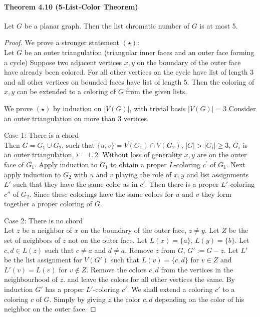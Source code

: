 \paragraph{Theorem 4.10 (5-List-Color Theorem)} Let $ G $ be a planar graph.
Then the list chromatic number of $ G $ is at most 5.
\begin{proof}
    We prove a stronger statement $(\star)$: \\
    Let $G$ be an outer triangulation (triangular inner faces and an 
    outer face forming a cycle) Suppose two adjacent vertices $x,y$
    on the boundary of the outer face have already been colored. 
    For all other vertices on the cycle have list of length 3 and 
    all other vertices on bounded faces have list of length 5. Then 
    the coloring of $x,y$ can be extended to a coloring of $G$ from 
    the given lists.

    \bigskip \noindent
    We prove $(\star)$ by induction on $|V(G)|$, with trivial basis $|V(G)| =3$
    Consider an outer triangulation on more than 3 vertices.

    \smallskip \noindent
    Case 1: There is a chord \\
    Then $G = G_1 \cup G_2$, such that $\{u,v\} = V(G_1) \cap V(G_2)$, 
    $|G| > |G_i| \geq 3$, $G_i$ is an outer triangulation, $i = 1,2$. Without 
    loss of generality $x,y$ are on the outer face of $G_1$. Apply induction 
    to $G_1$ to obtain a proper $L$-coloring $c^\prime$ of $G_1$. Next apply
    induction to $G_2$ with $u$ and $v$ playing the role of $x,y$ and 
    list assignments $L'$ such that they have the same color as in $c'$.
    Then there is a proper $L'$-coloring $c''$ of $G_2$. Since these colorings
    have the same colors for $u$ and $v$ they form together a  proper coloring
    of $G$.

    \smallskip \noindent
    Case 2: There is no chord \\
    Let $z$ be a neighbor of $x$ on the boundary of the outer face, $z \neq y$.
    Let $Z$ be the set of neighbors of $z$ not on the outer face. Let 
    $L(x) = \{a\}$, $L(y) = \{b\}$. Let $c,d \in L(z)$ such that 
    $c \neq a$ and $d\neq a$. Remove $z$ from $G$, $G' := G -z$.
    Let $L'$ be the list assignment for $V(G')$ such that 
    $L(v) = \{c,d\}$ for $v \in Z$ and $L'(v) = L(v)$ for $v \notin Z$.
    Remove the colors $c,d$ from the vertices in the neighbourhood of $z$. 
    and leave the colors for all other vertices the same. By induction $G'$
    has a proper $L'$-coloring $c'$. We shall extend a coloring $c'$ to 
    a coloring $c$ of $G$. Simply by giving $z$ the color $c, d$ depending on
    the color of his neighbor on the outer face. 

\end{proof}